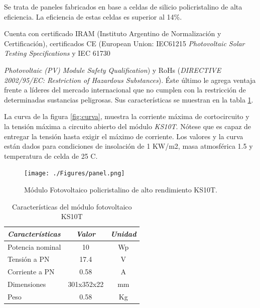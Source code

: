 Se trata de paneles fabricados en base a celdas de silicio policristalino de alta eficiencia. La eficiencia de estas celdas es superior al 14\%.

Cuenta con certificado IRAM (Instituto Argentino de Normalización y Certificación), certificados CE (European Union: IEC61215 \textit{Photovoltaic Solar Testing Specifications} y IEC 61730 {\textit{Photovoltaic (PV) Module Safety Qualification}) y RoHs (\textit{DIRECTIVE 2002/95/EC: Restriction of Hazardous Substances}). Éste último le agrega ventaja frente a líderes del mercado internacional que no cumplen con la restricción de determinadas sustancias peligrosas. Sus características se muestran en la tabla \ref{tab:ks10t}. 

La curva de la figura \ref{fig:curva}, muestra la corriente máxima de cortocircuito y la tensión máxima a circuito abierto del módulo \textit{KS10T}. Nótese que es capaz de entregar la tensión hasta exigir el máximo de corriente. Los valores y la curva están dados para condiciones de insolación de 1 KW/m2, masa atmosférica 1.5 y temperatura de celda de 25 \grados C\citep{solar}.

 \begin{figure}[h!]
	\centering
    \texttt{[image: ./Figures/panel.png]}
    	\caption{Módulo Fotovoltaico policristalino de alto rendimiento KS10T.}
	\label{fig:ks10t}
\end{figure}

\vspace{10px}

\begin{table}[ht]
	\centering
	\caption{Características del módulo fotovoltaico KS10T}
	\begin{tabular}{@{} l *2c @{}}    \toprule
		\emph{\textbf{Características}} & \emph{\textbf{Valor}} & \emph{\textbf{Unidad}}\\
		\midrule
		Potencia nominal	& 10 	& Wp	\\	
		Tensión a PN		& 17.4	& V\\
		Corriente a PN	& 0.58		& A\\
		Dimensiones		& 301x352x22 	& mm\\
		Peso				& 0.58		& Kg	\\
		\bottomrule
		\hline
	\end{tabular}
	\label{tab:ks10t}
\end{table}


}
